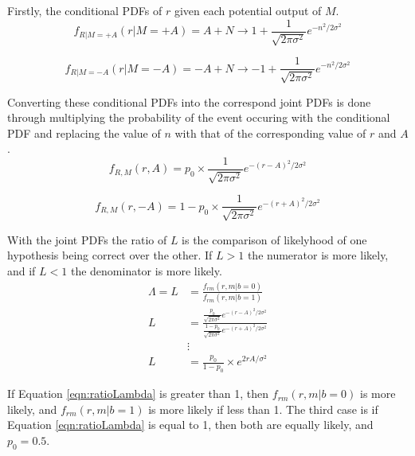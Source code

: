 \documentclass[a4paper, 11pt]{article}
\begin{document}
Firstly, the conditional PDFs of \(r\) given each potential output of \(M\).
\begin{equation}
\label{eqn:condPDFA}
    f_{R|M=+A}(r|M=+A) = A + N \rightarrow 1 + \frac{1}{\sqrt{2\pi\sigma^2}}e^{-n^2/2\sigma^2}
\end{equation}

\begin{equation}
\label{eqn:condPDFNegA}
    f_{R|M=-A}(r|M=-A) = -A + N \rightarrow -1 + \frac{1}{\sqrt{2\pi\sigma^2}}e^{-n^2/2\sigma^2}
\end{equation}

Converting these conditional PDFs into the correspond joint PDFs is done through multiplying the probability of the event occuring with the conditional PDF and replacing the value of \(n\) with that of the corresponding value of \(r\) and \(A\).
\begin{equation}
\label{eqn:jointPDFA}
    f_{R,M}(r,A) = p_0 \times \frac{1}{\sqrt{2\pi\sigma^2}}e^{-(r-A)^2/2\sigma^2}
\end{equation}

\begin{equation}
\label{eqn:jointPDFNegA}
    f_{R,M}(r,-A) = 1-p_0 \times \frac{1}{\sqrt{2\pi\sigma^2}}e^{-(r+A)^2/2\sigma^2}
\end{equation}

With the joint PDFs the ratio of \(L\) is the comparison of likelyhood of one hypothesis being correct over the other. If \(L > 1\) the numerator is more likely, and if \(L < 1\) the denominator is more likely.
\begin{align}
\label{eqn:ratioLambda}
    \Lambda = L &= \frac{f_{rm}(r,m|b=0)}{f_{rm}(r,m|b=1)}\nonumber \\
    L &= \displaystyle \frac{\displaystyle \frac{p_0}{\sqrt{2\pi\sigma^2}}e^{-(r-A)^2/2\sigma^2}}{\displaystyle \frac{1-p_0}{\sqrt{2\pi\sigma^2}}e^{-(r+A)^2/2\sigma^2}}\nonumber \\
    & \vdots\nonumber \\
    L &= \frac{p_0}{1-p_0} \times e^{2rA/\sigma^2}
\end{align}

If Equation \ref{eqn:ratioLambda} is greater than 1, then \(f_{rm}(r,m|b=0)\) is more likely, and \(f_{rm}(r,m|b=1)\) is more likely if less than 1. The third case is if Equation \ref{eqn:ratioLambda} is equal to 1, then both are equally likely, and \(p_0 = 0.5\).
\end{document}
